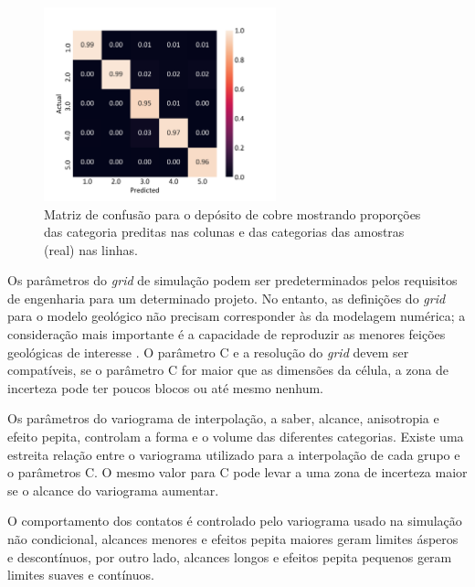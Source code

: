 \begin{figure}[H]
	\caption{\label{fig:backflag_bound_hier} Matriz de confusão para o depósito de cobre mostrando proporções das categoria preditas nas colunas e das categorias das amostras (real) nas linhas.}
	\centering
		\includegraphics[width=0.6\textwidth]{capitulo_3/imagens/backflag_bound_hier.png}
\end{figure}

Os parâmetros do \textit{grid} de simulação podem ser predeterminados pelos requisitos de engenharia para um determinado projeto. No entanto, as definições do \textit{grid} para o modelo geológico não precisam corresponder às da modelagem numérica; a consideração mais importante é a capacidade de reproduzir as menores feições geológicas de interesse \cite{martin}. O parâmetro C e a resolução do \textit{grid} devem ser compatíveis, se o parâmetro C for maior que as dimensões da célula, a zona de incerteza pode ter poucos blocos ou até mesmo nenhum.

Os parâmetros do variograma de interpolação, a saber, alcance, anisotropia e efeito pepita, controlam a forma e o volume das diferentes categorias. Existe uma estreita relação entre o variograma utilizado para a interpolação de cada grupo e o parâmetros C. O mesmo valor para C pode levar a uma zona de incerteza maior se o alcance do variograma aumentar.

O comportamento dos contatos é controlado pelo variograma usado na simulação não condicional, alcances menores e efeitos pepita maiores geram limites ásperos e descontínuos, por outro lado, alcances longos e efeitos pepita pequenos geram limites suaves e contínuos.

